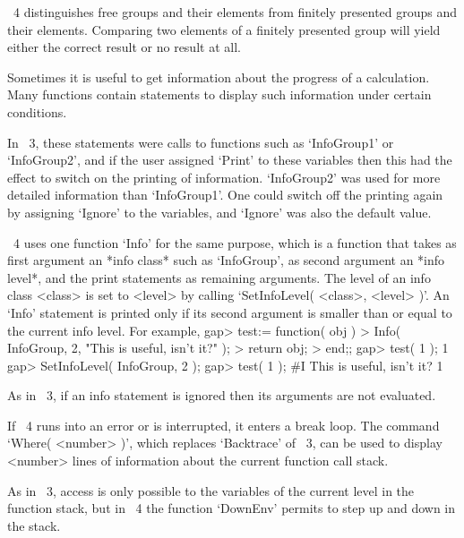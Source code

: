 {\GAP}~4 distinguishes free groups and their elements from finitely
presented groups and their elements.
Comparing two elements of a finitely presented group will yield either
the correct result or no result at all.



Sometimes it is useful to get information about the progress of a
calculation.
Many {\GAP} functions contain statements to display such information
under certain conditions.

In {\GAP}~3, these statements were calls to functions such as
`InfoGroup1' or `InfoGroup2', and if the user assigned `Print' to
these variables then this had the effect to switch on the printing of
information.
`InfoGroup2' was used for more detailed information than `InfoGroup1'.
One could switch off the printing again by assigning `Ignore' to the
variables, and `Ignore' was also the default value.

{\GAP}~4 uses one function `Info' for the same purpose,
which is a function that takes as first argument an *info class* such as
`InfoGroup', as second argument an *info level*, and the print statements
as remaining arguments.
The level of an info class <class> is set to <level> by calling
`SetInfoLevel( <class>, <level> )'.
An `Info' statement is printed only if its second argument is smaller than
or equal to the current info level.
For example,
\begintt
    gap> test:= function( obj )
    > Info( InfoGroup, 2, "This is useful, isn't it?" );
    > return obj;
    > end;;
    gap> test( 1 );
    1
    gap> SetInfoLevel( InfoGroup, 2 );
    gap> test( 1 );
    #I  This is useful, isn't it?
    1
\endtt

As in {\GAP}~3, if an info statement is ignored then its arguments are
not evaluated.



If {\GAP}~4 runs into an error or is interrupted,
it enters a break loop.
The command `Where( <number> )', which replaces `Backtrace' of {\GAP}~3,
can be used to display <number> lines of information about the current
function call stack.

As in {\GAP}~3, access is only possible to the variables of the current
level in the function stack,
but in {\GAP}~4 the function `DownEnv' permits to step up and down in the
stack.

